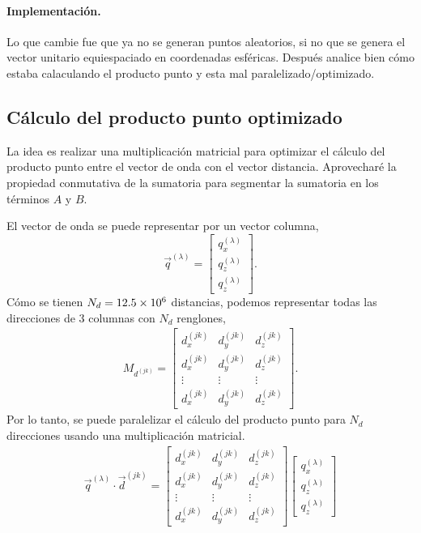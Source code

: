 \documentclass[../main.tex]{subfiles}
\begin{document}
\paragraph{Implementación.}
Lo que cambie fue que ya no se generan puntos aleatorios, si no que se genera el vector unitario equiespaciado en coordenadas esféricas.
Después analice bien cómo estaba calaculando el producto punto y esta mal paralelizado/optimizado.

\subsection{Cálculo del producto punto optimizado}

La idea es realizar una multiplicación matricial para optimizar el cálculo del producto punto entre el vector de onda con el vector distancia.
Aprovecharé la propiedad conmutativa de la sumatoria para segmentar la sumatoria en los términos $A$ y $B$.

El vector de onda se puede representar por un vector columna, \[\vec{q}^{(\lambda)}=\begin{bmatrix}q_x^{(\lambda)} \\ q_z^{(\lambda)} \\ q_z^{(\lambda)}\end{bmatrix}.\]
Cómo se tienen \(N_{d}=\num{12.5d6}\) distancias, podemos representar todas las direcciones de 3 columnas con \(N_{d}\) renglones,
\begin{gather*}
    M_{d^{(jk)}} = 
        \begin{bmatrix}
            d_{x}^{(jk)} & d_{y}^{(jk)} & d_{z}^{(jk)} \\
            d_{x}^{(jk)} & d_{y}^{(jk)} & d_{z}^{(jk)} \\
            \vdots & \vdots & \vdots \\
            d_{x}^{(jk)} & d_{y}^{(jk)} & d_{z}^{(jk)}
        \end{bmatrix}.
\end{gather*}
Por lo tanto, se puede paralelizar el cálculo del producto punto para \(N_{d}\) direcciones usando una multiplicación matricial.
\begin{gather*}
    \vec{q}^{(\lambda)}\cdot\vec{d}^{(jk)} = 
    \begin{bmatrix}
            d_{x}^{(jk)} & d_{y}^{(jk)} & d_{z}^{(jk)} \\
            d_{x}^{(jk)} & d_{y}^{(jk)} & d_{z}^{(jk)} \\
            \vdots & \vdots & \vdots \\
            d_{x}^{(jk)} & d_{y}^{(jk)} & d_{z}^{(jk)}
        \end{bmatrix}
        \begin{bmatrix}q_x^{(\lambda)} \\ q_z^{(\lambda)} \\ q_z^{(\lambda)}\end{bmatrix}
\end{gather*}
\end{document}
